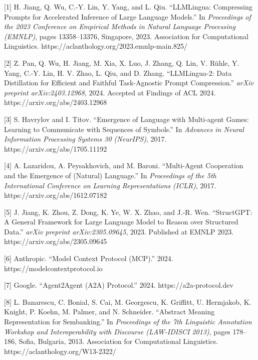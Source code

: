 {[}1{]} H. Jiang, Q. Wu, C.-Y. Lin, Y. Yang, and L. Qiu. ``LLMLingua: Compressing Prompts for Accelerated Inference of Large Language Models.'' In \emph{Proceedings of the 2023 Conference on Empirical Methods in Natural Language Processing (EMNLP)}, pages 13358--13376, Singapore, 2023. Association for Computational Linguistics. https://aclanthology.org/2023.emnlp-main.825/



{[}2{]} Z. Pan, Q. Wu, H. Jiang, M. Xia, X. Luo, J. Zhang, Q. Lin, V. Rühle, Y. Yang, C.-Y. Lin, H. V. Zhao, L. Qiu, and D. Zhang. ``LLMLingua-2: Data Distillation for Efficient and Faithful Task-Agnostic Prompt Compression.'' \emph{arXiv preprint arXiv:2403.12968}, 2024. Accepted at Findings of ACL 2024. https://arxiv.org/abs/2403.12968



{[}3{]} S. Havrylov and I. Titov. ``Emergence of Language with Multi-agent Games: Learning to Communicate with Sequences of Symbols.'' In \emph{Advances in Neural Information Processing Systems 30 (NeurIPS)}, 2017. https://arxiv.org/abs/1705.11192



{[}4{]} A. Lazaridou, A. Peysakhovich, and M. Baroni. ``Multi-Agent Cooperation and the Emergence of (Natural) Language.'' In \emph{Proceedings of the 5th International Conference on Learning Representations (ICLR)}, 2017. https://arxiv.org/abs/1612.07182



{[}5{]} J. Jiang, K. Zhou, Z. Dong, K. Ye, W. X. Zhao, and J.-R. Wen. ``StructGPT: A General Framework for Large Language Model to Reason over Structured Data.'' \emph{arXiv preprint arXiv:2305.09645}, 2023. Published at EMNLP 2023. https://arxiv.org/abs/2305.09645



{[}6{]} Anthropic. ``Model Context Protocol (MCP).'' 2024. https://modelcontextprotocol.io



{[}7{]} Google. ``Agent2Agent (A2A) Protocol.'' 2024. https://a2a-protocol.dev



{[}8{]} L. Banarescu, C. Bonial, S. Cai, M. Georgescu, K. Griffitt, U. Hermjakob, K. Knight, P. Koehn, M. Palmer, and N. Schneider. ``Abstract Meaning Representation for Sembanking.'' In \emph{Proceedings of the 7th Linguistic Annotation Workshop and Interoperability with Discourse (LAW-IDISCI 2013)}, pages 178--186, Sofia, Bulgaria, 2013. Association for Computational Linguistics. https://aclanthology.org/W13-2322/



